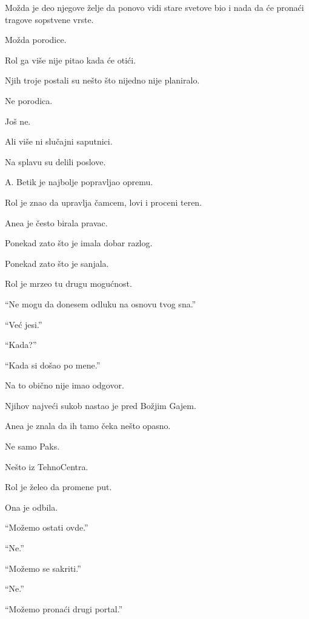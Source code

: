 Možda je deo njegove želje da ponovo vidi stare svetove bio i nada da će pronaći tragove sopstvene vrste.

Možda porodice.

\bigskip

Rol ga više nije pitao kada će otići.

\bigskip

Njih troje postali su nešto što nijedno nije planiralo.

Ne porodica.

Još ne.

Ali više ni slučajni saputnici.

\bigskip

Na splavu su delili poslove.

A. Betik je najbolje popravljao opremu.

Rol je znao da upravlja čamcem, lovi i proceni teren.

Anea je često birala pravac.

\bigskip

Ponekad zato što je imala dobar razlog.

Ponekad zato što je sanjala.

\bigskip

Rol je mrzeo tu drugu mogućnost.

``Ne mogu da donesem odluku na osnovu tvog sna.''

``Već jesi.''

``Kada?''

``Kada si došao po mene.''

\bigskip

Na to obično nije imao odgovor.

\bigskip

Njihov najveći sukob nastao je pred Božjim Gajem.

Anea je znala da ih tamo čeka nešto opasno.

Ne samo Paks.

Nešto iz TehnoCentra.

\bigskip

Rol je želeo da promene put.

Ona je odbila.

\bigskip

``Možemo ostati ovde.''

``Ne.''

``Možemo se sakriti.''

``Ne.''

``Možemo pronaći drugi portal.''


